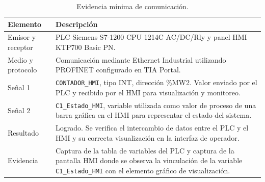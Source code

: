 \begin{table}[H]
\centering
\small
\caption{Evidencia mínima de comunicación.}
\label{tab:evidencia_comunicacion}
\begin{tabularx}{\textwidth}{L{4cm}Y}
\toprule
\textbf{Elemento} & \textbf{Descripción} \\
\midrule
Emisor y receptor & PLC Siemens S7-1200 CPU 1214C AC/DC/Rly y panel HMI KTP700 Basic PN. \\
Medio y protocolo & Comunicación mediante Ethernet Industrial utilizando PROFINET configurado en TIA Portal. \\
Señal 1 & \texttt{CONTADOR\_HMI}, tipo INT, dirección \%MW2. Valor enviado por el PLC y recibido por el HMI para visualización y monitoreo. \\
Señal 2 & \texttt{C1\_Estado\_HMI}, variable utilizada como valor de proceso de una barra gráfica en el HMI para representar el estado del sistema. \\
Resultado & Logrado. Se verifica el intercambio de datos entre el PLC y el HMI y su correcta visualización en la interfaz de operador. \\
Evidencia & Captura de la tabla de variables del PLC y captura de la pantalla HMI donde se observa la vinculación de la variable \texttt{C1\_Estado\_HMI} con el elemento gráfico de visualización. \\
\bottomrule
\end{tabularx}
\end{table}